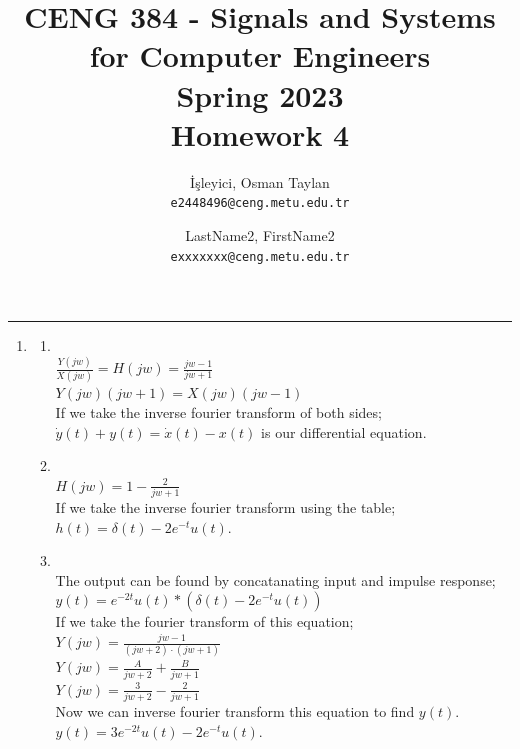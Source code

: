 \documentclass[10pt,a4paper, margin=1in]{article}
\author{
  İşleyici, Osman Taylan\\
  \texttt{e2448496@ceng.metu.edu.tr}
  \and
  LastName2, FirstName2\\
  \texttt{exxxxxxx@ceng.metu.edu.tr}
}
\title{CENG 384 - Signals and Systems for Computer Engineers \\
Spring 2023 \\
Homework 4}
\begin{document}
\maketitle



\noindent\rule{19cm}{1.2pt}

\begin{enumerate}

    \item %
          \begin{enumerate}
              \item~\\
              $\frac{Y(jw)}{X(jw)} = H(jw) = \frac{jw-1}{jw+1}$\\
              $Y(jw)(jw+1) = X(jw)(jw-1)$\\
              If we take the inverse fourier transform of both sides;\\
              $\dot{y}(t)+y(t) = \dot{x}(t)-x(t)$ is our differential equation.
              \item~\\
              $H(jw) = 1-\frac{2}{jw+1}$\\ If we take the inverse fourier transform using the table;\\
              $h(t) = \delta(t) - 2e^{-t}u(t)$.
              \item~\\
              The output can be found by concatanating input and impulse response;\\
              $y(t) = e^{-2t}u(t)\ast(\delta(t)-2e^{-t}u(t))$\\
              If we take the fourier transform of this equation;\\
              $Y(jw) = \frac{jw-1}{(jw+2)\cdot(jw+1)}$\\
              $Y(jw) = \frac{A}{jw+2}+\frac{B}{jw+1}$\\
              $Y(jw) = \frac{3}{jw+2} - \frac{2}{jw+1}$\\
              Now we can inverse fourier transform this equation to find $y(t)$.\\
              $y(t) = 3e^{-2t}u(t) - 2e^{-t}u(t)$.\\
\end{enumerate}
\end{enumerate}
\end{document}
